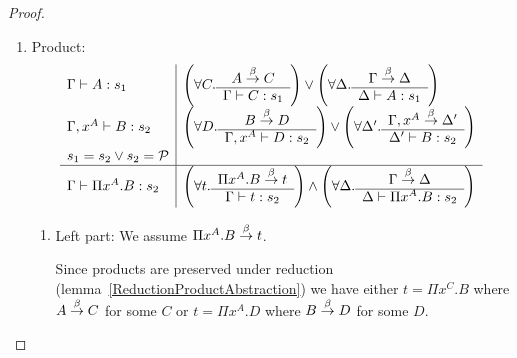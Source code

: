 \begin{theorem}
{\begin{proof}
\begin{enumerate}
\begin{enumerate}
                    For the right part we assume $\Gamma,x^A \reduce \Delta$.
                    There are two possibilities:
                    \begin{enumerate}
                        \item $\Delta = \Delta_0,x^A$ where $\Gamma \reduce
                            \Delta_0$ for some $\Delta_0$:

                        In that case we get $\Delta_0 \vdash A: s$ from the
                            induction hypothesis which implies the goal
                            $\Delta_0,x^A \vdash x: A$.

                        \item $\Delta = \Gamma,x^B$ where $A \reduce B$:

                        In that case we get $\Gamma \vdash B : s$ from the
                            induction hypothesis which implies the goal
                            $\Gamma,x^B: x \vdash B$.
                    \end{enumerate}

                \item Product:
                $$
                \begin{array}{l|l}
                    \Gamma \vdash A: s_1
                    &
                    \left( \forall C. \begin{array}{c} A \stackrel{\beta}{\to} C \\ \hline \Gamma \vdash C: s_1\end{array} \right)
                    \lor
                    \left( \forall \Delta. \begin{array}{c} \Gamma \stackrel{\beta}{\to} \Delta \\ \hline \Delta \vdash A: s_1\end{array} \right)
                    \\
                    \Gamma,x^A \vdash B: s_2
                    &
                    \left( \forall D. \begin{array}{c} B \stackrel{\beta}{\to} D \\ \hline \Gamma,x^A \vdash D: s_2\end{array} \right)
                    \lor
                    \left( \forall \Delta'. \begin{array}{c} \Gamma,x^A \stackrel{\beta}{\to} \Delta' \\ \hline \Delta' \vdash B: s_2\end{array} \right)
                    \\
                    s_1 = s_2 \lor s_2 = {\cal P}
                    \\
                    \hline
                    \Gamma \vdash \Pi x^A. B : s_2
                    &
                    \left( \forall t. \begin{array}{c} \Pi x^A.B \stackrel{\beta}{\to} t \\ \hline \Gamma \vdash t: s_2\end{array} \right)
                    \land
                    \left( \forall \Delta. \begin{array}{c} \Gamma \stackrel{\beta}{\to} \Delta \\ \hline \Delta \vdash \Pi x^A. B: s_2\end{array} \right)
                \end{array}
                $$
                \begin{enumerate}
                    \item Left part: We assume $\Pi x^A. B \stackrel{\beta}{\to} t$.

                    Since products are preserved under reduction
                        (lemma~\ref{ReductionProductAbstraction}) we have either
                        $t = \Pi x^C. B$ where $A \stackrel{\beta}{\to} C$ for some $C$ or $t
                        = \Pi x^A.D$ where $B \stackrel{\beta}{\to} D$ for some $D$.


\end{enumerate}
\end{enumerate}
\end{enumerate}
\end{proof}}
\end{theorem}
